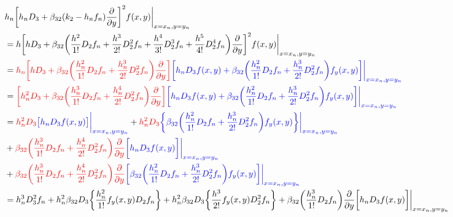 \documentclass[12 pt]{article}
\begin{document}
	{
		\normalsize
		\begin{align*}
			&h_{n}\bigg[h_{n}D_{3}+\beta_{32}(k_{2}-h_{n}f_{n})\frac{\partial}{\partial y}\bigg]^{2}f(x,y)\bigg\vert_{x = x_{n}, y= y_{n}} \\
			&= h\bigg[hD_{3} + \beta_{32}\bigg(\frac{h^{2}}{1!}D_{2}f_{n} + \frac{h^{3}}{2!}D_{2}^{2}f_{n} + \frac{h^{4}}{3!}D_{2}^{3}f_{n} + \frac{h^{5}}{4!}D_{2}^{4}f_{n}\bigg)\frac{\partial}{\partial y}\bigg]^{2}f(x,y)\bigg\vert_{x = x_{n}, y= y_{n}}\\
			&= \color{red}h_{n}\bigg[hD_{3} + \beta_{32}\bigg(\frac{h_{n}^{2}}{1!}D_{2}f_{n} +\frac{h_{n}^{3}}{2!}D_{2}^{2}f_{n}  \bigg)\frac{\partial}{\partial y}\bigg]\color{blue}\bigg[h_{n}D_{3}f(x,y) + \beta_{32}\bigg(\frac{h_{n}^{2}}{1!}D_{2}f_{n} + \frac{h_{n}^{3}}{2!}D_{2}^{2}f_{n}\bigg)f_{y}(x,y)\bigg]\bigg\vert_{x = x_{n}, y= y_{n}}\\
			&= \color{red}\bigg[h_{n}^{2}D_{3} + \beta_{32}\bigg(\frac{h_{n}^{3}}{1!}D_{2}f_{n} + \frac{h_{n}^{4}}{2!}D_{2}^{2}f_{n}  \bigg)\frac{\partial}{\partial y}\bigg]\color{blue}\bigg[h_{n}D_{3}f(x,y) + \beta_{32}\bigg(\frac{h_{n}^{2}}{1!}D_{2}f_{n} + \frac{h_{n}^{3}}{2!}D_{2}^{2}f_{n}\bigg)f_{y}(x,y)\bigg]\bigg\vert_{x = x_{n}, y= y_{n}}\\
			&= \color{red}h_{n}^{2}D_{3}\color{blue}\big[h_{n}D_{3}f(x,y)\big]\bigg\vert_{x = x_{n}, y= y_{n}} \color{black} + \color{red}h_{n}^{2}D_{3}\color{blue}\bigg\{\beta_{32}\bigg(\frac{h_{n}^{2}}{1!}D_{2}f_{n} + \frac{h_{n}^{3}}{2!}D_{2}^{2}f_{n}\bigg)f_{y}(x,y)\bigg\}\bigg\vert_{x = x_{n}, y= y_{n}} \color{black}\\
			&+ \color{red}\beta_{32}\bigg(\frac{h_{n}^{3}}{1!}D_{2}f_{n} + \frac{h_{n}^{4}}{2!}D_{2}^{2}f_{n} \bigg)\frac{\partial}{\partial y}\color{blue}\bigg[h_{n}D_{3}f(x,y)\bigg]\bigg\vert_{x = x_{n}, y= y_{n}}\\ 
			&+ \color{red}\beta_{32}\bigg(\frac{h_{n}^{3}}{1!}D_{2}f_{n} + \frac{h_{n}^{4}}{2!}D_{2}^{2}f_{n} \bigg)\frac{\partial}{\partial y}\color{blue}\bigg[\beta_{32}\bigg(\frac{h_{n}^{2}}{1!}D_{2}f_{n} +\color{blue}\frac{h_{n}^{3}}{2!}D_{2}^{2}f_{n}\bigg)f_{y}(x,y)\bigg]\bigg\vert_{x = x_{n}, y= y_{n}}\\
			&= h_{n}^{3}D_{3}^{2}f_{n} + h_{n}^{2}\beta_{32}D_{3}\bigg\{ \frac{h_{n}^{2}}{1!}f_{y}(x,y)D_{2}f_{n}\bigg\} + h_{n}^{2}\beta_{32}D_{3}\bigg\{\frac{h^{3}}{2!}f_{y}(x,y)D_{2}^{2}f_{n}\bigg\} + \beta_{32}\bigg(\frac{h_{n}^{3}}{1!}D_{2}f_{n}\bigg)\frac{\partial}{\partial y}\bigg[h_{n}D_{3}f(x,y)\bigg]\bigg\vert_{x = x_{n}, y= y_{n}}  \\

\end{align*}}
\end{document}
